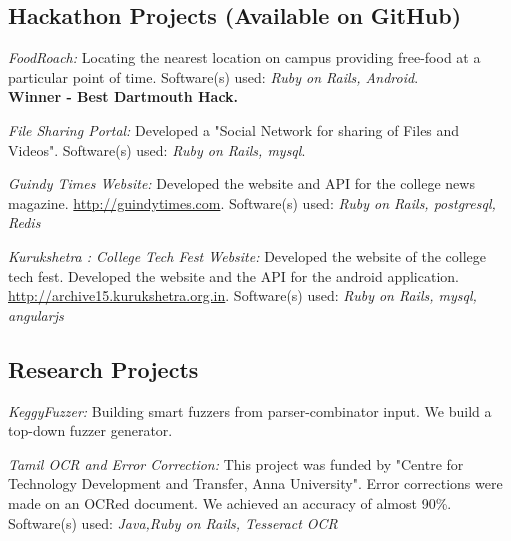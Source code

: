 \documentclass[letterpaper,10pt]{article}
\renewenvironment{itemize}{
  \begin{list}{}{
    \setlength{\leftmargin}{1.5em}
  }
}{
  \end{list}
}
\begin{document}
\subsection*{Hackathon Projects (Available on GitHub)}
\begin{itemize}
\setlength\itemsep{0ex}
  \item \textit{FoodRoach:} Locating the nearest location on campus providing free-food at a particular point of time. Software(s) used: \textsl{Ruby on Rails, Android}. \\ {\bf Winner - Best Dartmouth Hack.}
\item \textit{File Sharing Portal:} Developed a "Social Network for sharing of Files and Videos". Software(s) used: \textsl{Ruby on Rails, mysql}.
\item \textit{Guindy Times Website:} Developed the website and API for the college news magazine. \url{http://guindytimes.com}. Software(s) used: \textsl{Ruby on Rails, postgresql, Redis}
\item \textit{Kurukshetra : College Tech Fest Website:} Developed the website of the college tech fest. Developed the website and the API for the android application. \url{http://archive15.kurukshetra.org.in}. Software(s) used: \textsl{Ruby on Rails, mysql, angularjs}
\end{itemize}


\subsection*{Research Projects}

\begin{itemize}
\setlength\itemsep{0ex}
\item \textit{KeggyFuzzer:} Building smart fuzzers from parser-combinator input. We build a top-down fuzzer generator.

\item \textit{Tamil OCR and Error Correction:} This project was funded by "Centre for Technology Development and Transfer, Anna University". Error corrections were made on an OCRed document. We achieved an accuracy of almost 90\%. Software(s) used: \textsl{Java,Ruby on Rails, Tesseract OCR}

\end{itemize}
\end{document}
